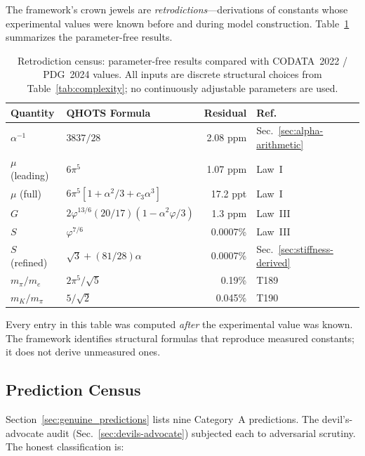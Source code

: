 \documentclass[aps,prd,twocolumn,superscriptaddress,floatfix,nofootinbib]{revtex4-2}
\theoremstyle{definition}
\theoremstyle{remark}
\newcommand{\vp}{\varphi}
\begin{document}
The framework's crown jewels are \emph{retrodictions}---derivations of
constants whose experimental values were known before and during model
construction.  Table~\ref{tab:retrodiction-census} summarizes the
parameter-free results.

\begin{table}[ht]
\centering
\caption{Retrodiction census: parameter-free results compared with
  CODATA~2022 / PDG~2024 values.  All inputs are discrete structural
  choices from Table~\ref{tab:complexity}; no continuously adjustable
  parameters are used.}
\label{tab:retrodiction-census}
\begin{tabular}{llrl}
\toprule
Quantity & QHOTS Formula & Residual & Ref.\ \\
\midrule
$\alpha^{-1}$ & $3837/28$ & 2.08 ppm & Sec.~\ref{sec:alpha-arithmetic} \\
$\mu$ (leading) & $6\pi^5$ & 1.07 ppm & Law~I \\
$\mu$ (full) & $6\pi^5[1+\alpha^2/3+c_3\alpha^3]$ & 17.2 ppt & Law~I \\
$G$ & $2\vp^{13/6}(20/17)(1{-}\alpha^2\vp/3)$ & 1.3 ppm & Law~III \\
$S$ & $\vp^{7/6}$ & 0.0007\% & Law~III \\
$S$ (refined) & $\sqrt{3}+(81/28)\alpha$ & 0.0007\% & Sec.~\ref{sec:stiffness-derived} \\
$m_\pi/m_e$ & $2\pi^5/\sqrt{5}$ & 0.19\% & T189 \\
$m_K/m_\pi$ & $5/\sqrt{2}$ & 0.045\% & T190 \\
\bottomrule
\end{tabular}
\end{table}

\noindent
Every entry in this table was computed \emph{after} the experimental
value was known.  The framework identifies structural formulas that
reproduce measured constants; it does not derive unmeasured ones.

\subsection{Prediction Census}
\label{sec:prediction-census}

Section~\ref{sec:genuine_predictions} lists nine Category~A predictions.
The devil's-advocate audit (Sec.~\ref{sec:devils-advocate}) subjected
each to adversarial scrutiny.  The honest classification is:
\end{document}

